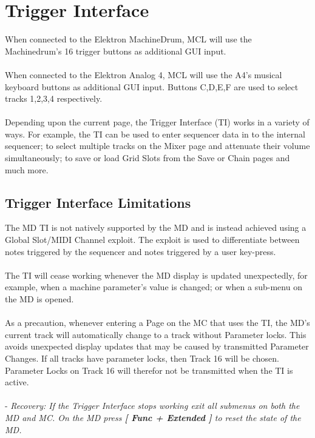 \chapter{Trigger Interface}
When connected to the Elektron MachineDrum, MCL will use the Machinedrum's 16 trigger buttons as additional GUI input. \\
\\
When connected to the Elektron Analog 4, MCL will use the A4's musical keyboard buttons as additional GUI input. Buttons C,D,E,F are used to select tracks 1,2,3,4 respectively.\\
\\
Depending upon the current page, the Trigger Interface (TI) works in a variety of ways.
For example, the TI can be used to enter sequencer data in to the internal sequencer;
to select multiple tracks on the Mixer page and attenuate their volume simultaneously; to save or load Grid Slots from the Save or Chain pages and much more.

\section{Trigger Interface Limitations}
The MD TI is not natively supported by the MD and is instead achieved using a Global Slot/MIDI Channel exploit. The exploit is used to differentiate between notes triggered by the sequencer and notes triggered by a user key-press.\\
\\
The TI will cease working whenever the MD display is updated unexpectedly, for example, when a machine parameter's value is changed; or when a sub-menu on the MD is opened.\\
\\
As a precaution, whenever entering a Page on the MC that uses the TI, the MD's current track will automatically change to a track without Parameter locks. This avoids unexpected display updates that may be caused by transmitted Parameter Changes. If all tracks have parameter locks, then Track 16 will be chosen. Parameter Locks on Track 16 will therefor not be transmitted when the TI is active.\\
\\-
\textit{Recovery: If the Trigger Interface stops working exit all submenus on both the MD and MC. On the MD press \textbf{[ Func + Extended ]} to reset the state of the MD.}
